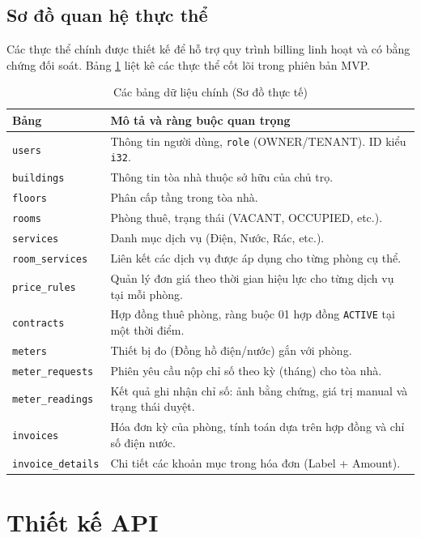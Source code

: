 \subsection{Sơ đồ quan hệ thực thể}

Các thực thể chính được thiết kế để hỗ trợ quy trình billing linh hoạt và có bằng chứng đối soát. Bảng \ref{tab:entities} liệt kê các thực thể cốt lõi trong phiên bản MVP.

\begin{table}[htbp]
\centering
\caption{Các bảng dữ liệu chính (Sơ đồ thực tế)}
\label{tab:entities}
\begin{tabularx}{\textwidth}{lX}
\toprule
\textbf{Bảng} & \textbf{Mô tả và ràng buộc quan trọng} \\
\midrule
\texttt{users} & Thông tin người dùng, \texttt{role} (OWNER/TENANT). ID kiểu \texttt{i32}. \\
\texttt{buildings} & Thông tin tòa nhà thuộc sở hữu của chủ trọ. \\
\texttt{floors} & Phân cấp tầng trong tòa nhà. \\
\texttt{rooms} & Phòng thuê, trạng thái (VACANT, OCCUPIED, etc.). \\
\texttt{services} & Danh mục dịch vụ (Điện, Nước, Rác, etc.). \\
\texttt{room\_services} & Liên kết các dịch vụ được áp dụng cho từng phòng cụ thể. \\
\texttt{price\_rules} & Quản lý đơn giá theo thời gian hiệu lực cho từng dịch vụ tại mỗi phòng. \\
\texttt{contracts} & Hợp đồng thuê phòng, ràng buộc 01 hợp đồng \texttt{ACTIVE} tại một thời điểm. \\
\texttt{meters} & Thiết bị đo (Đồng hồ điện/nước) gắn với phòng. \\
\texttt{meter\_requests} & Phiên yêu cầu nộp chỉ số theo kỳ (tháng) cho tòa nhà. \\
\texttt{meter\_readings} & Kết quả ghi nhận chỉ số: ảnh bằng chứng, giá trị manual và trạng thái duyệt. \\
\texttt{invoices} & Hóa đơn kỳ của phòng, tính toán dựa trên hợp đồng và chỉ số điện nước. \\
\texttt{invoice\_details} & Chi tiết các khoản mục trong hóa đơn (Label + Amount). \\
\bottomrule
\end{tabularx}
\end{table}

\section{Thiết kế API}

